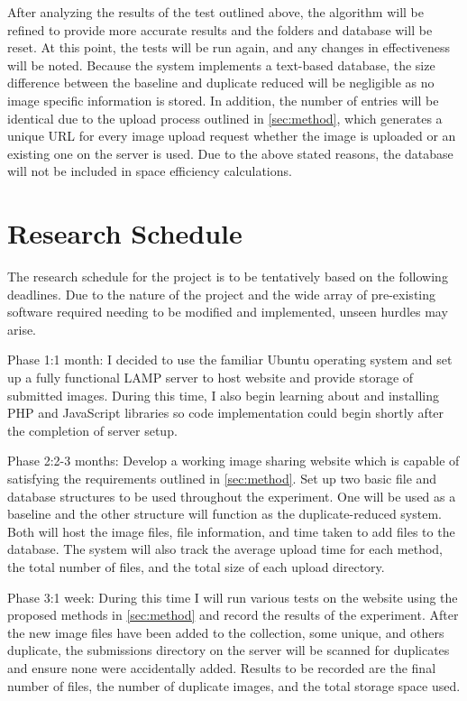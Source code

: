 \documentclass[11pt]{article}
\begin{document}
After analyzing the results of the test outlined above, the algorithm will be refined to provide more accurate results and the folders and database will be reset. At this point, the tests will be run again, and any changes in effectiveness will be noted. Because the system implements a text-based database, the size difference between the baseline and duplicate reduced will be negligible as no image specific information is stored. In addition, the number of entries will be identical due to the upload process outlined in \ref{sec:method}, which generates a unique URL for every image upload request whether the image is uploaded or an existing one on the server is used. Due to the above stated reasons, the database will not be included in space efficiency calculations.

\vspace*{-.1in}
\section{Research Schedule}
\label{sec:schedule}
\vspace*{-.1in}

The research schedule for the project is to be tentatively based on the following deadlines.
Due to the nature of the project and the wide array of pre-existing software required needing to
be modified and implemented, unseen hurdles may arise.

Phase 1:1 month: I decided to use the familiar Ubuntu operating system and set up a fully functional LAMP server to host website and provide storage of submitted images. During this time, I also begin learning about and installing PHP and JavaScript libraries so code implementation could begin shortly after the completion of server setup.

Phase 2:2-3 months: Develop a working image sharing website which is capable of satisfying the requirements
outlined in \ref{sec:method}. Set up two basic file and database structures to be used throughout the experiment. One will be used as a baseline and the other structure will function as the duplicate-reduced system. Both will host the image files, file information, and time taken to add files to the database. The system will also track the average upload time for each method, the total number of files, and the total size of each upload directory.

Phase 3:1 week: During this time I will run various tests on the website using the proposed
methods in \ref{sec:method} and record the results of the experiment. After the new image files have been added to the collection, some unique, and others duplicate, the submissions directory on the server will be scanned for  duplicates and ensure none were accidentally added. Results to be recorded are the final number of files, the number of duplicate images, and the total storage space used.
\end{document}
